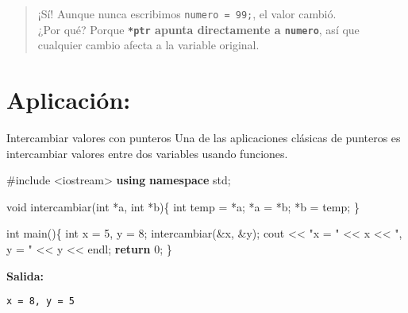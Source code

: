 \documentclass[
  11pt,
  a4paper,
  DIV=11,
  numbers=noendperiod]{scrreprt}
\newenvironment{Shaded}{\begin{snugshade}}{\end{snugshade}}
\newcommand{\ControlFlowTok}[1]{\textcolor[rgb]{0.00,0.23,0.31}{\textbf{#1}}}
\newcommand{\DataTypeTok}[1]{\textcolor[rgb]{0.68,0.00,0.00}{#1}}
\newcommand{\DecValTok}[1]{\textcolor[rgb]{0.68,0.00,0.00}{#1}}
\newcommand{\ImportTok}[1]{\textcolor[rgb]{0.00,0.46,0.62}{#1}}
\newcommand{\KeywordTok}[1]{\textcolor[rgb]{0.00,0.23,0.31}{\textbf{#1}}}
\newcommand{\NormalTok}[1]{\textcolor[rgb]{0.00,0.23,0.31}{#1}}
\newcommand{\OperatorTok}[1]{\textcolor[rgb]{0.37,0.37,0.37}{#1}}
\newcommand{\PreprocessorTok}[1]{\textcolor[rgb]{0.68,0.00,0.00}{#1}}
\newcommand{\StringTok}[1]{\textcolor[rgb]{0.13,0.47,0.30}{#1}}
\begin{document}
\begin{quote}
¡Sí! Aunque nunca escribimos \texttt{numero\ =\ 99;}, el valor cambió.\\
¿Por qué? Porque \textbf{\texttt{*ptr} apunta directamente a
\texttt{numero}}, así que cualquier cambio afecta a la variable
original.
\end{quote}

\section{\texorpdfstring{\textbf{Aplicación:}}{Aplicación:}}\label{aplicaciuxf3n}

Intercambiar valores con punteros Una de las aplicaciones clásicas de
punteros es intercambiar valores entre dos variables usando funciones.

\begin{Shaded}
\begin{Highlighting}[]
\PreprocessorTok{\#include }\ImportTok{\textless{}iostream\textgreater{}}
\KeywordTok{using} \KeywordTok{namespace}\NormalTok{ std}\OperatorTok{;}

\DataTypeTok{void}\NormalTok{ intercambiar}\OperatorTok{(}\DataTypeTok{int} \OperatorTok{*}\NormalTok{a}\OperatorTok{,} \DataTypeTok{int} \OperatorTok{*}\NormalTok{b}\OperatorTok{)\{}
    \DataTypeTok{int}\NormalTok{ temp }\OperatorTok{=} \OperatorTok{*}\NormalTok{a}\OperatorTok{;}
    \OperatorTok{*}\NormalTok{a }\OperatorTok{=} \OperatorTok{*}\NormalTok{b}\OperatorTok{;}
    \OperatorTok{*}\NormalTok{b }\OperatorTok{=}\NormalTok{ temp}\OperatorTok{;}
\OperatorTok{\}}

\DataTypeTok{int}\NormalTok{ main}\OperatorTok{()\{}
    \DataTypeTok{int}\NormalTok{ x }\OperatorTok{=} \DecValTok{5}\OperatorTok{,}\NormalTok{ y }\OperatorTok{=} \DecValTok{8}\OperatorTok{;}
\NormalTok{    intercambiar}\OperatorTok{(\&}\NormalTok{x}\OperatorTok{,} \OperatorTok{\&}\NormalTok{y}\OperatorTok{);}
\NormalTok{    cout }\OperatorTok{\textless{}\textless{}} \StringTok{"x = "} \OperatorTok{\textless{}\textless{}}\NormalTok{ x }\OperatorTok{\textless{}\textless{}} \StringTok{", y = "} \OperatorTok{\textless{}\textless{}}\NormalTok{ y }\OperatorTok{\textless{}\textless{}}\NormalTok{ endl}\OperatorTok{;}
    \ControlFlowTok{return} \DecValTok{0}\OperatorTok{;}
\OperatorTok{\}}
\end{Highlighting}
\end{Shaded}

\textbf{Salida:}

\begin{tcolorbox}[custombox]
\begin{verbatim}
x = 8, y = 5
\end{verbatim}
\end{tcolorbox}
\end{document}
